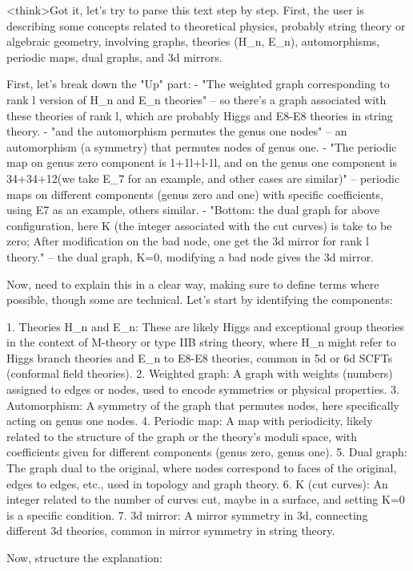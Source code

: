 <think>Got it, let's try to parse this text step by step. First, the user is describing some concepts related to theoretical physics, probably string theory or algebraic geometry, involving graphs, theories (H_n, E_n), automorphisms, periodic maps, dual graphs, and 3d mirrors. 

First, let's break down the "Up" part:
- "The weighted graph corresponding to rank l version of H_n and E_n theories" – so there's a graph associated with these theories of rank l, which are probably Higgs and E8-E8 theories in string theory.
- "and the automorphism permutes the genus one nodes" – an automorphism (a symmetry) that permutes nodes of genus one.
- "The periodic map on genus zero component is 1+1l+l-1l, and on the genus one component is 34+34+12(we take E_7 for an example, and other cases are similar)" – periodic maps on different components (genus zero and one) with specific coefficients, using E7 as an example, others similar.
- "Bottom: the dual graph for above configuration, here K (the integer associated with the cut curves) is take to be zero; After modification on the bad node, one get the 3d mirror for rank l theory." – the dual graph, K=0, modifying a bad node gives the 3d mirror.

Now, need to explain this in a clear way, making sure to define terms where possible, though some are technical. Let's start by identifying the components:

1. Theories H_n and E_n: These are likely Higgs and exceptional group theories in the context of M-theory or type IIB string theory, where H_n might refer to Higgs branch theories and E_n to E8-E8 theories, common in 5d or 6d SCFTs (conformal field theories).
2. Weighted graph: A graph with weights (numbers) assigned to edges or nodes, used to encode symmetries or physical properties.
3. Automorphism: A symmetry of the graph that permutes nodes, here specifically acting on genus one nodes.
4. Periodic map: A map with periodicity, likely related to the structure of the graph or the theory's moduli space, with coefficients given for different components (genus zero, genus one).
5. Dual graph: The graph dual to the original, where nodes correspond to faces of the original, edges to edges, etc., used in topology and graph theory.
6. K (cut curves): An integer related to the number of curves cut, maybe in a surface, and setting K=0 is a specific condition.
7. 3d mirror: A mirror symmetry in 3d, connecting different 3d theories, common in mirror symmetry in string theory.

Now, structure the explanation:

